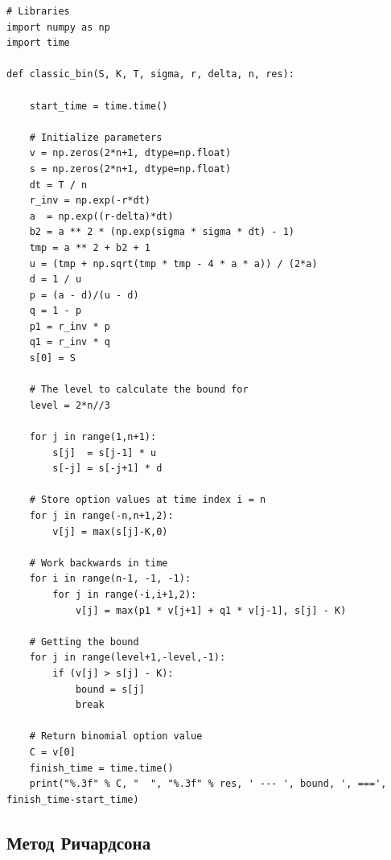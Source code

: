 \documentclass[oneside,final,12pt]{article}
\begin{document}
\begin{lstlisting}
# Libraries
import numpy as np
import time

def classic_bin(S, K, T, sigma, r, delta, n, res):
    
    start_time = time.time()
    
    # Initialize parameters
    v = np.zeros(2*n+1, dtype=np.float)
    s = np.zeros(2*n+1, dtype=np.float)
    dt = T / n
    r_inv = np.exp(-r*dt)
    a  = np.exp((r-delta)*dt)
    b2 = a ** 2 * (np.exp(sigma * sigma * dt) - 1)
    tmp = a ** 2 + b2 + 1
    u = (tmp + np.sqrt(tmp * tmp - 4 * a * a)) / (2*a)
    d = 1 / u
    p = (a - d)/(u - d)
    q = 1 - p
    p1 = r_inv * p
    q1 = r_inv * q
    s[0] = S

    # The level to calculate the bound for
    level = 2*n//3 
    
    for j in range(1,n+1):
        s[j]  = s[j-1] * u
        s[-j] = s[-j+1] * d

    # Store option values at time index i = n
    for j in range(-n,n+1,2):
        v[j] = max(s[j]-K,0)

    # Work backwards in time
    for i in range(n-1, -1, -1):
        for j in range(-i,i+1,2):
            v[j] = max(p1 * v[j+1] + q1 * v[j-1], s[j] - K)
            
    # Getting the bound
    for j in range(level+1,-level,-1):
        if (v[j] > s[j] - K):
            bound = s[j]
            break

    # Return binomial option value
    C = v[0]
    finish_time = time.time()
    print("%.3f" % C, "  ", "%.3f" % res, ' --- ', bound, ', ===', finish_time-start_time)
\end{lstlisting}

\newpage
{}
\subsection*{Метод Ричардсона}
\end{document}
